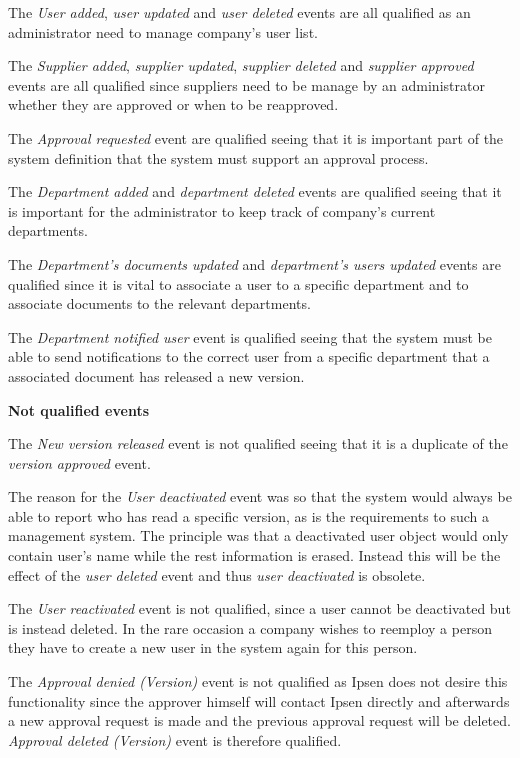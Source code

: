 The \textit{User added}, \textit{user updated} and \textit{user deleted} events are all qualified as an administrator need to manage company's user list.

The \textit{Supplier added}, \textit{supplier updated},  \textit{supplier deleted} and \textit{supplier approved} events are all qualified since suppliers need to be manage by an administrator whether they are approved or when to be reapproved.

The \textit{Approval requested} event are qualified seeing that it is important part of the system definition that the system must support an approval process.

The \textit{Department added} and \textit{department deleted} events are qualified seeing that it is important for the administrator to keep track of company's current departments.

The \textit{Department's documents updated} and \textit{department's users updated} events are qualified since it is vital to associate a user to a specific department and to associate documents to the relevant departments.

The \textit{Department notified user} event is qualified seeing that the system must be able to send notifications to the correct user from a specific department that a associated document has released a new version.

\textbf{Not qualified events}

The \textit{New version released} event is not qualified seeing that it is a duplicate of the \textit{version approved} event.

The reason for the \textit{User deactivated} event was so that the system would always be able to report who has read a specific version, as is the requirements to such a management system.
The principle was that a deactivated user object would only contain user's name while the rest information is erased.
Instead this will be the effect of the \textit{user deleted} event and thus \textit{user deactivated} is obsolete.

The \textit{User reactivated} event is not qualified, since a user cannot be deactivated but is instead deleted. In the rare occasion a company wishes to reemploy a person they have to create a new user in the system again for this person.

The \textit{Approval denied (Version)} event is not qualified as Ipsen does not desire this functionality since the approver himself will contact Ipsen directly and afterwards a new approval request is made and the previous approval request will be deleted.
\textit{Approval deleted (Version)} event is therefore qualified.

